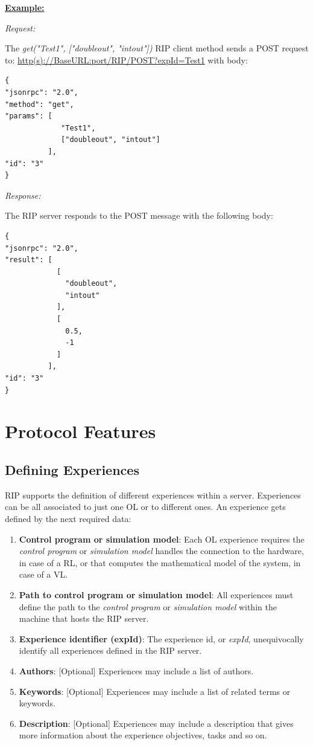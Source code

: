 \textbf{\underline{Example:}}

\textit{Request:}

The \textit{get("Test1", ["doubleout", "intout"])} RIP client method sends a POST request to: \url{http(s)://BaseURL:port/RIP/POST?expId=Test1} with body:

\begin{lstlisting}
{
"jsonrpc": "2.0",
"method": "get",
"params": [
  	         "Test1",
  	         ["doubleout", "intout"]
          ],
"id": "3"
}
\end{lstlisting}

\textit{Response:}

The RIP server responds to the POST message with the following body:

\begin{lstlisting}
{
"jsonrpc": "2.0",
"result": [
            [
              "doubleout",
              "intout"
            ],
            [
              0.5,
              -1
            ]
          ],
"id": "3"
}
\end{lstlisting}


\chapter{Protocol Features}
\label{System Features}

\section{Defining Experiences}
RIP supports the definition of different experiences within a server. Experiences can be all associated to just one OL or to different ones. An experience gets defined by the next required data:

\begin{enumerate}
    \item \textbf{Control program or simulation model}: Each OL experience requires the \textit{control program} or \textit{simulation model} handles the connection to the hardware, in case of a RL, or that computes the mathematical model of the system, in case of a VL.
    \item \textbf{Path to control program or simulation model}: All experiences must define the path to the \textit{control program} or \textit{simulation model} within the machine that hosts the RIP server.
    \item \textbf{Experience identifier (expId)}: The experience id, or \textit{expId}, unequivocally identify all experiences defined in the RIP server.
    \item \textbf{Authors}: [Optional] Experiences may include a list of authors.
    \item \textbf{Keywords}: [Optional] Experiences may include a list of related terms or keywords.
    \item \textbf{Description}: [Optional] Experiences may include a description that gives more information about the experience objectives, tasks and so on.
\end{enumerate}

